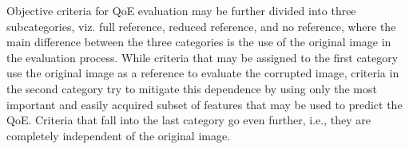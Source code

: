 Objective criteria for QoE evaluation may be further divided into three subcategories, viz. full reference, reduced reference, and no reference, where the main difference between the three categories is the use of the original image in the evaluation process. While criteria that may be assigned to the first category use the original image as a reference to evaluate the corrupted image, criteria in the second category try to mitigate this dependence by using only the most important and easily acquired subset of features that may be used to predict the QoE. Criteria that fall into the last category go even further, i.e., they are completely independent of the original image.



